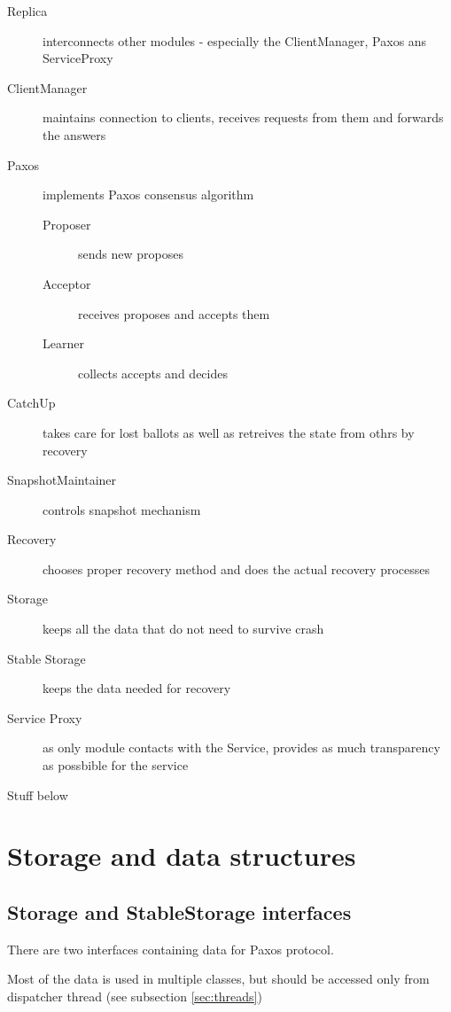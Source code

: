 \begin{description}
  \item[Replica ] interconnects other modules - especially the ClientManager, Paxos ans ServiceProxy
  \item[ClientManager ] maintains connection to clients, receives requests from them and forwards the answers
  \item[Paxos ] implements Paxos consensus algorithm
  \begin{description}
    \item[Proposer ] sends new proposes
    \item[Acceptor ] receives proposes and accepts them
    \item[Learner ] collects accepts and decides
  \end{description}
  \item[CatchUp ] takes care for lost ballots as well as retreives the state from othrs by recovery
  \item[SnapshotMaintainer ] controls snapshot mechanism
  \item[Recovery ] chooses proper recovery method and does the actual recovery processes
  \item[Storage ] keeps all the data that do not need to survive crash
  \item[Stable Storage ] keeps the data needed for recovery
  \item[Service Proxy ] as only module contacts with the Service, provides as much transparency as possbible for the service
\end{description}

\begin{TODO}
 Stuff below
\end{TODO}


\section{Storage and data structures}
\label{sec:storage_and_data_structures}

\subsection{Storage and StableStorage interfaces}
\label{subsubsec:storage_and_stablestorage_interfaces}

There are two interfaces containing data for Paxos protocol.

Most of the data is used in multiple classes, but should be accessed only from dispatcher thread (see subsection \ref{sec:threads})

